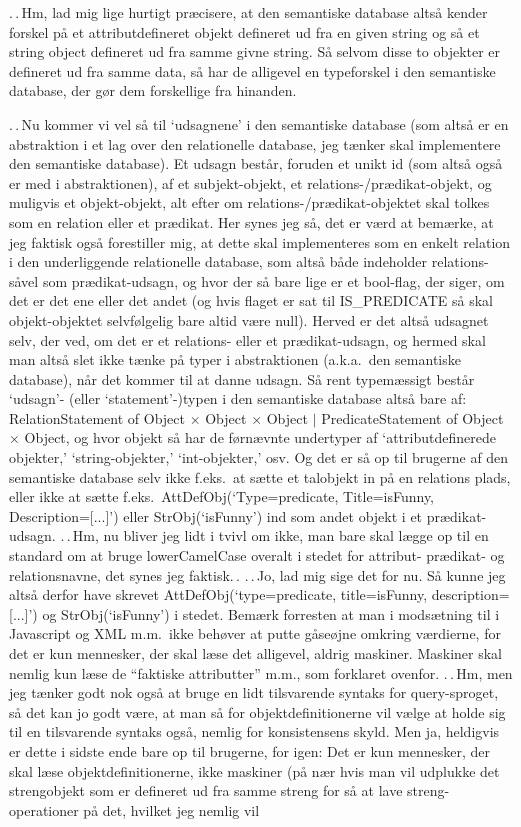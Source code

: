\documentclass{report}
\begin{document}
.\,.\,Hm, lad mig lige hurtigt præcisere, at den semantiske database altså kender forskel på et attributdefineret objekt defineret ud fra en given string og så et string object defineret ud fra samme givne string. Så selvom disse to objekter er defineret ud fra samme data, så har de alligevel en typeforskel i den semantiske database, der gør dem forskellige fra hinanden. 

.\,.\,Nu kommer vi vel så til `udsagnene' i den semantiske database (som altså er en abstraktion i et lag over den relationelle database, jeg tænker skal implementere den semantiske database). Et udsagn består, foruden et unikt id (som altså også er med i abstraktionen), af et subjekt-objekt, et relations-/prædikat-objekt, og muligvis et objekt-objekt, alt efter om relations-/prædikat-objektet skal tolkes som en relation eller et prædikat. Her synes jeg så, det er værd at bemærke, at jeg faktisk også forestiller mig, at dette skal implementeres som en enkelt relation i den underliggende relationelle database, som altså både indeholder relations- såvel som prædikat-udsagn, og hvor der så bare lige er et bool-flag, der siger, om det er det ene eller det andet (og hvis flaget er sat til IS\_PREDICATE så skal objekt-objektet selvfølgelig bare altid være null). Herved er det altså udsagnet selv, der ved, om det er et relations- eller et prædikat-udsagn, og hermed skal man altså slet ikke tænke på typer i abstraktionen (a.k.a.\ den semantiske database), når det kommer til at danne udsagn. Så rent typemæssigt består `udsagn'- (eller `statement'-)typen i den semantiske database altså bare af: RelationStatement of Object $\times$ Object $\times$ Object $|$ PredicateStatement of Object $\times$ Object, og hvor objekt så har de førnævnte undertyper af `attributdefinerede objekter,' `string-objekter,' `int-objekter,' osv. Og det er så op til brugerne af den semantiske database selv ikke f.eks.\ at sætte et talobjekt in på en relations plads, eller ikke at sætte f.eks.\ AttDefObj(`Type=predicate, Title=isFunny, Description=[...]') eller StrObj(`isFunny') ind som andet objekt i et prædikat-udsagn. .\,.\,Hm, nu bliver jeg lidt i tvivl om ikke, man bare skal lægge op til en standard om at bruge lowerCamelCase overalt i stedet for attribut- prædikat- og relationsnavne, det synes jeg faktisk.\,. .\,.\,Jo, lad mig sige det for nu. Så kunne jeg altså derfor have skrevet AttDefObj(`type=predicate, title=isFunny, description=[...]') og StrObj(`isFunny') i stedet. Bemærk forresten at man i modsætning til i Javascript og XML m.m.\ ikke behøver at putte gåseøjne omkring værdierne, for det er kun mennesker, der skal læse det alligevel, aldrig maskiner. Maskiner skal nemlig kun læse de ``faktiske attributter'' m.m., som forklaret ovenfor. .\,.\,Hm, men jeg tænker godt nok også at bruge en lidt tilsvarende syntaks for query-sproget, så det kan jo godt være, at man så for objektdefinitionerne vil vælge at holde sig til en tilsvarende syntaks også, nemlig for konsistensens skyld. Men ja, heldigvis er dette i sidste ende bare op til brugerne, for igen: Det er kun mennesker, der skal læse objektdefinitionerne, ikke maskiner (på nær hvis man vil udplukke det strengobjekt som er defineret ud fra samme streng for så at lave streng-operationer på det, hvilket jeg nemlig vil 
\end{document}
